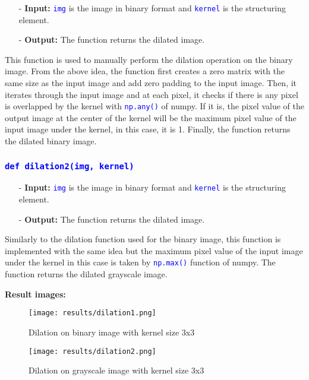 \documentclass{report}
\begin{document}
\begin{itemize}
  \item[-] \textbf{Input:} \textcolor{blue}{\lstinline|img|} is the image in binary format and \textcolor{blue}{\lstinline|kernel|} is the structuring element.
  \item[-] \textbf{Output:} The function returns the dilated image.
\end{itemize}

This function is used to manually perform the dilation operation on the binary image. From the above idea, the function first creates a zero matrix with the same size as the input image and add zero padding to the input image. Then, it iterates through the input image and at each pixel, it checks if there is any pixel is overlapped by the kernel with \textcolor{blue}{\lstinline|np.any()|} of numpy. If it is, the pixel value of the output image at the center of the kernel will be the maximum pixel value of the input image under the kernel, in this case, it is 1. Finally, the function returns the dilated binary image.

\subsubsection*{\textcolor{blue}{\lstinline|def dilation2(img, kernel)|}}

\begin{itemize}
  \item[-] \textbf{Input:} \textcolor{blue}{\lstinline|img|} is the image in binary format and \textcolor{blue}{\lstinline|kernel|} is the structuring element.
  \item[-] \textbf{Output:} The function returns the dilated image.
\end{itemize}

Similarly to the dilation function used for the binary image, this function is implemented with the same idea but the maximum pixel value of the input image under the kernel in this case is taken by \textcolor{blue}{\lstinline|np.max()|} function of numpy. The function returns the dilated grayscale image.

\pagebreak
\textbf{Result images:}
\begin{figure}[H]
    \centering
    \texttt{[image: results/dilation1.png]}
    \caption{Dilation on binary image with kernel size 3x3}
    \bigskip
    \texttt{[image: results/dilation2.png]}
    \caption{Dilation on grayscale image with kernel size 3x3}
\end{figure}
\end{document}
